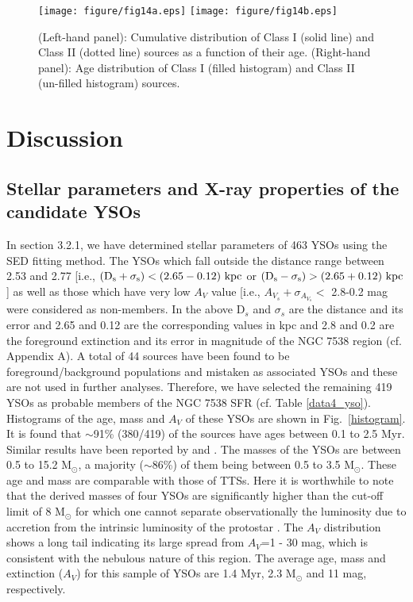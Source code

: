 \documentclass[a4paper,fleqn,usenatbib,useAMS]{mnras}
\begin{document}
\begin{figure}
\centering\texttt{[image: figure/fig14a.eps]}
\centering\texttt{[image: figure/fig14b.eps]}
\caption{\label{cum} (Left-hand panel): Cumulative distribution of Class I (solid line) and Class II (dotted line)
sources as a function of their age.
(Right-hand panel): Age distribution of Class I (filled histogram) and Class II (un-filled histogram) sources.}
\end{figure}


\section{Discussion}


\subsection{Stellar parameters and X-ray properties of the candidate YSOs}

In section 3.2.1, we have determined stellar parameters of 463 YSOs using the SED fitting method.
The YSOs which fall outside the distance range between 2.53 and 2.77
[i.e., $\rm (D_{s} + \sigma_{s}) < (2.65-0.12) ~kpc $ or $\rm  (D_{s} - \sigma_{s}) > (2.65+0.12) ~kpc $]
as well as those which have very low $A_V$ value [i.e., $A_{V_{s}} + \sigma_{A_{V_{s}}}<$ 2.8-0.2 mag were considered as non-members.
In the above D$_s$ and $\sigma_{s}$ are the distance and its error and 2.65 and 0.12 are the corresponding values in kpc and 2.8 and 0.2 are the foreground extinction and its error in magnitude of the  NGC 7538 region (cf. Appendix A).
A total of 44 sources have been found to be foreground/background populations and mistaken as associated YSOs 
and these are not used in further analyses.   Therefore, we have selected the remaining 419 YSOs  
as probable members of  the NGC 7538 SFR (cf. Table \ref {data4_yso}). 
Histograms of the age, mass and $A_V$ of these YSOs are shown in Fig.~\ref{histogram}.  
It is found that $\sim$91\% (380/419) of the sources have ages between 0.1 to 2.5 Myr.
Similar results have been reported by \citet{2010A&A...517A...2P} and \citet{2004AJ....128.2942B}. 
The masses of the YSOs are between 0.5 to 15.2 M$_\odot$, a majority ($\sim$86\%) of them
being between 0.5 to 3.5 M$_\odot$. 
These age and mass are comparable with those of TTSs.
Here it is worthwhile to note that the derived masses of four YSOs 
are significantly higher than the cut-off limit of 8 M$_\odot$
for which one cannot separate observationally the luminosity due to accretion
from the intrinsic luminosity of the protostar \citep{2011isf..book.....W}. 
The $A_V$ distribution shows a long tail indicating its large spread from $A_V$=1 - 30 mag,
which is consistent with the nebulous nature of this region.
The average age, mass and extinction ($A_V$) for this sample of YSOs are 1.4 Myr, 2.3 M$_\odot$ and 11 mag, respectively.
\end{document}

